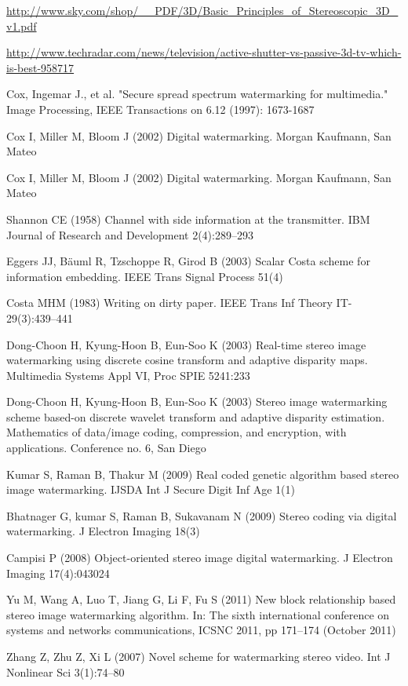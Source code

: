 \begin{thebibliography}{99}
 \url{http://www.sky.com/shop/__PDF/3D/Basic_Principles_of_Stereoscopic_3D_v1.pdf}

 \url{http://www.techradar.com/news/television/active-shutter-vs-passive-3d-tv-which-is-best-958717}

Cox, Ingemar J., et al. "Secure spread spectrum watermarking for multimedia." Image Processing, IEEE Transactions on 6.12 (1997): 1673-1687

Cox I, Miller M, Bloom J (2002) Digital watermarking. Morgan Kaufmann, San Mateo


 Cox I, Miller M, Bloom J (2002) Digital watermarking. Morgan Kaufmann, San Mateo

 Shannon CE (1958) Channel with side information at the transmitter. IBM Journal of Research and Development 2(4):289–293

 Eggers JJ, Bäuml R, Tzschoppe R, Girod B (2003) Scalar Costa scheme for information embedding. IEEE Trans Signal Process 51(4)

 Costa MHM (1983) Writing on dirty paper. IEEE Trans Inf Theory IT-29(3):439–441


Dong-Choon H, Kyung-Hoon B, Eun-Soo K (2003) Real-time stereo image watermarking using discrete cosine transform and adaptive disparity maps. Multimedia Systems Appl VI, Proc SPIE 5241:233

Dong-Choon H, Kyung-Hoon B, Eun-Soo K (2003) Stereo image watermarking scheme based-on discrete wavelet transform and adaptive disparity estimation. Mathematics of data/image coding, compression, and encryption, with applications. Conference no. 6, San Diego

Kumar S, Raman B, Thakur M (2009) Real coded genetic algorithm based stereo image watermarking. IJSDA Int J Secure Digit Inf Age 1(1)

Bhatnager G, kumar S, Raman B, Sukavanam N (2009) Stereo coding via digital watermarking. J Electron Imaging 18(3)

Campisi P (2008) Object-oriented stereo image digital watermarking. J Electron Imaging 17(4):043024

Yu M, Wang A, Luo T, Jiang G, Li F, Fu S (2011) New block relationship based stereo image watermarking algorithm. In: The sixth international conference on systems and networks communications, ICSNC 2011, pp 171–174 (October 2011)

Zhang Z, Zhu Z, Xi L (2007) Novel scheme for watermarking stereo video. Int J Nonlinear Sci 3(1):74–80


\end{thebibliography}
